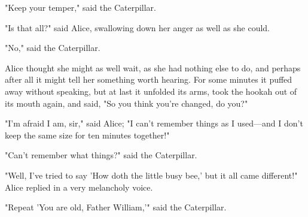 "Keep your temper," said the Caterpillar.

​"Is that all?" said Alice, swallowing down her anger as well as she could.

"No," said the Caterpillar.

Alice thought she might as well wait, as she had nothing else to do, and perhaps after all it might tell her something worth hearing. For some minutes it puffed away without speaking, but at last it unfolded its arms, took the hookah out of its mouth again, and said, "So you think you're changed, do you?"

"I'm afraid I am, sir," said Alice; "I can't remember things as I used—and I don't keep the same size for ten minutes together!"

"Can't remember what things?" said the Caterpillar.

"Well, I've tried to say 'How doth the little busy bee,' but it all came different!" Alice replied in a very melancholy voice.

"Repeat 'You are old, Father William,'" said the Caterpillar.

